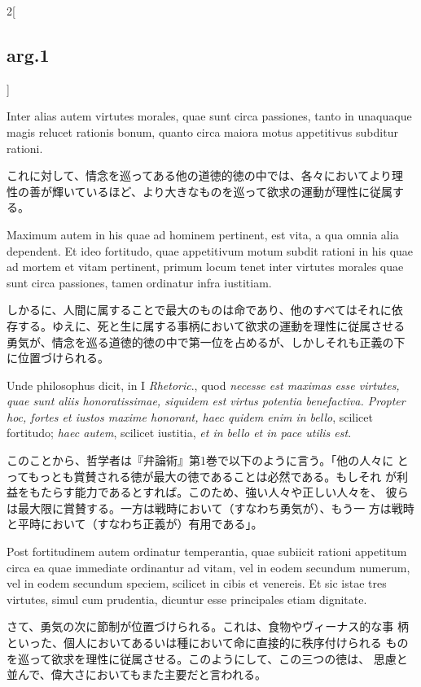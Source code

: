 \documentclass[paper=a4paper,fontsize=10pt,jafontsize=9pt,titlepage]{jlreq}
\begin{document}
\begin{paracol}{2}[\subsection{arg.1}]
\switchcolumn*

Inter alias autem virtutes morales, quae sunt circa
passiones, tanto in unaquaque magis relucet rationis bonum, quanto
circa maiora motus appetitivus subditur rationi.

\switchcolumn

これに対して、情念を巡ってある他の道徳的徳の中では、各々においてより理
性の善が輝いているほど、より大きなものを巡って欲求の運動が理性に従属す
る。

\switchcolumn*

Maximum autem in his quae ad hominem pertinent, est vita, a qua omnia
alia dependent. Et ideo fortitudo, quae appetitivum motum subdit
rationi in his quae ad mortem et vitam pertinent, primum locum tenet
inter virtutes morales quae sunt circa passiones, tamen ordinatur
infra iustitiam.

\switchcolumn

しかるに、人間に属することで最大のものは命であり、他のすべてはそれに依
存する。ゆえに、死と生に属する事柄において欲求の運動を理性に従属させる
勇気が、情念を巡る道徳的徳の中で第一位を占めるが、しかしそれも正義の下
に位置づけられる。

\switchcolumn*

Unde philosophus dicit, in I {\itshape Rhetoric}., quod {\itshape
necesse est maximas esse virtutes, quae sunt aliis honoratissimae,
siquidem est virtus potentia benefactiva. Propter hoc, fortes et
iustos maxime honorant, haec quidem enim in bello}, scilicet
fortitudo; {\itshape haec autem}, scilicet iustitia, {\itshape et in
bello et in pace utilis est}.

\switchcolumn

このことから、哲学者は『弁論術』第1巻で以下のように言う。「他の人々に
 とってもっとも賞賛される徳が最大の徳であることは必然である。もしそれ
 が利益をもたらす能力であるとすれば。このため、強い人々や正しい人々を、
 彼らは最大限に賞賛する。一方は戦時において（すなわち勇気が）、もう一
 方は戦時と平時において（すなわち正義が）有用である」。

\switchcolumn*

Post fortitudinem autem ordinatur temperantia, quae subiicit rationi
appetitum circa ea quae immediate ordinantur ad vitam, vel in eodem
secundum numerum, vel in eodem secundum speciem, scilicet in cibis et
venereis. Et sic istae tres virtutes, simul cum prudentia, dicuntur
esse principales etiam dignitate.

\switchcolumn

さて、勇気の次に節制が位置づけられる。これは、食物やヴィーナス的な事
 柄といった、個人においてあるいは種において命に直接的に秩序付けられる
 ものを巡って欲求を理性に従属させる。このようにして、この三つの徳は、
 思慮と並んで、偉大さにおいてもまた主要だと言われる。


\end{paracol}
\end{document}
